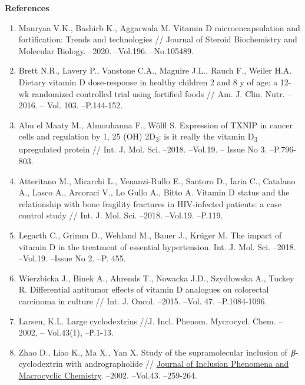 \begin{center}
{\bfseries References}
\end{center}

\begin{enumerate}
\item
Mauryaa V.K., Bashirb K., Aggarwala M. Vitamin D microencapsulation
and fortification: Trends and technologies // Journal of Steroid
Biochemistry and Molecular Biology. --2020. --Vol.196. --No.105489.

\item
Brett N.R., Lavery P., Vanstone C.A., Maguire J.L., Rauch F., Weiler
H.A. Dietary vitamin D dose-response in healthy children 2 and 8 y of
age: a 12-wk randomized controlled trial using fortified foods // Am. J.
Clin. Nutr. --2016. -- Vol. 103. --P.144-152.

\item
Abu el Maaty M., Almouhanna F., Wölfl S. Expression of TXNIP in
cancer cells and regulation by 1, 25 (OH) 2D\textsubscript{3}: is it
really the vitamin D\textsubscript{3} upregulated protein // Int. J.
Mol. Sci. --2018. --Vol.19. -- Issue No 3. --P.796-803.

\item
Atteritano M., Mirarchi L., Venanzi-Rullo E., Santoro D., Iaria C.,
Catalano A., Lasco A., Arcoraci V., Lo Gullo A., Bitto A. Vitamin D
status and the relationship with bone fragility fractures in
HIV-infected patients: a case control study // Int. J. Mol. Sci. --2018.
--Vol.19. --P.119.

\item
Legarth C., Grimm D., Wehland M., Bauer J., Krüger M. The impact of
vitamin D in the treatment of essential hypertension. Int. J. Mol. Sci.
--2018. --Vol.19. --Issue No 2. --P. 455.

\item
Wierzbicka J., Binek A., Ahrends T., Nowacka J.D., Szydłowska A.,
Tuckey R. Differential antitumor effects of vitamin D analogues on
colorectal carcinoma in culture // Int. J. Oncol. --2015. --Vol. 47.
--P.1084-1096.

\item
Larsen, K.L. Large cyclodextrins //J. Incl. Phenom. Mycrocycl. Chem.
--2002, -- Vol.43(1), --Р.1-13.

\item
Zhao D., Liao K., Ma X., Yan X. Study of the supramolecular inclusion
of~\emph{β}-cyclodextrin with andrographolide //
\href{https://link.springer.com/journal/10847}{Journal of Inclusion
Phenomena and Macrocyclic Chemistry}. --2002. --Vol.43. --259-264.


\end{enumerate}
